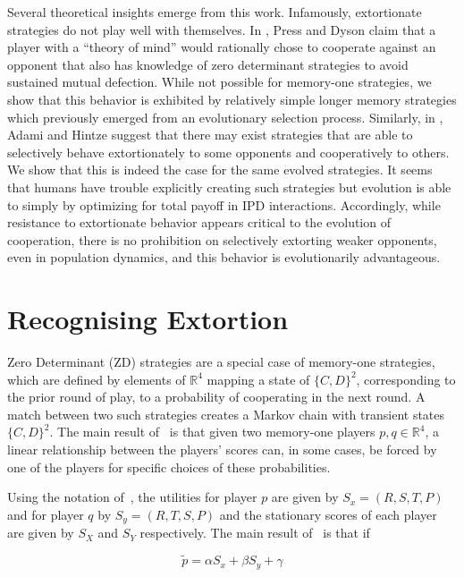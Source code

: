 \documentclass[a4paper]{article}
\begin{document}
Several theoretical insights emerge from this work. Infamously, extortionate
strategies do not play well with themselves. In \cite{press2012},
Press and Dyson claim that a player with a ``theory of mind'' would
rationally chose to cooperate against an opponent that also has knowledge
of zero determinant strategies to avoid sustained mutual defection. While not
possible for memory-one strategies, we show that this behavior is exhibited by
relatively simple longer memory strategies which previously emerged from an
evolutionary selection process. Similarly, in
\cite{adami2013evolutionary}, Adami and Hintze suggest that there may exist
strategies that are able to selectively behave extortionately to some opponents
and cooperatively to others. We show that this is indeed the case for the same
evolved strategies. It seems that humans have trouble explicitly creating such
strategies but evolution is able to simply by optimizing for total payoff in IPD
interactions. Accordingly, while resistance to extortionate behavior appears
critical to the evolution of cooperation, there is no prohibition on selectively
extorting weaker opponents, even in population dynamics, and this behavior is
evolutionarily advantageous.


\section{Recognising Extortion}\label{sec:sserror-zd-strategies}

Zero Determinant (ZD) strategies are a special case of memory-one strategies,
which are defined by elements of \(\mathbb{R}^4\) mapping a state of
\({\{C, D\}}^2\), corresponding to the prior round of play, to a probability of
cooperating in the next round. A match between two such strategies creates a
Markov chain with transient states \({\{C, D\}}^2\). The main result
of~\cite{Press2012} is that given two memory-one players \(p,
q\in\mathbb{R}^4\), a linear relationship between the players' scores can, in
some cases, be forced by one of the players for specific choices of these
probabilities.

Using the notation of~\cite{Press2012}, the utilities for player \(p\)
are given by \(S_x=(R, S, T, P)\) and for player \(q\) by \(S_y=(R, T, S, P)\)
and the stationary scores of each player are given by \(S_X\) and \(S_Y\)
respectively. The main result of~\cite{Press2012} is that if

\begin{equation}\label{eqn:linear_relationship_for_p}
    \tilde p=\alpha S_x + \beta S_y + \gamma
\end{equation}
\end{document}
